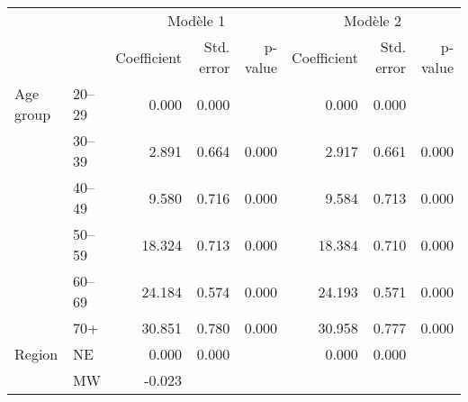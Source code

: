 \begin{table}[!h]
\centering
\begin{tabular}{llllllll}
\cline{1-8}
\multicolumn{1}{c}{} &
  \multicolumn{1}{c}{} &
  \multicolumn{3}{c}{Modèle 1} &
  \multicolumn{3}{c}{Modèle 2} \\
\multicolumn{1}{c}{} &
  \multicolumn{1}{c}{} &
  \multicolumn{1}{r}{Coefficient} &
  \multicolumn{1}{r}{Std. error} &
  \multicolumn{1}{r}{p-value} &
  \multicolumn{1}{r}{Coefficient} &
  \multicolumn{1}{r}{Std. error} &
  \multicolumn{1}{r}{p-value} \\
\cline{1-8}
\multicolumn{1}{l}{Age group} &
  \multicolumn{1}{l}{20–29} &
  \multicolumn{1}{r}{0.000} &
  \multicolumn{1}{r}{0.000} &
  \multicolumn{1}{r}{} &
  \multicolumn{1}{r}{0.000} &
  \multicolumn{1}{r}{0.000} &
  \multicolumn{1}{r}{} \\
\multicolumn{1}{l}{} &
  \multicolumn{1}{l}{30–39} &
  \multicolumn{1}{r}{2.891} &
  \multicolumn{1}{r}{0.664} &
  \multicolumn{1}{r}{0.000} &
  \multicolumn{1}{r}{2.917} &
  \multicolumn{1}{r}{0.661} &
  \multicolumn{1}{r}{0.000} \\
\multicolumn{1}{l}{} &
  \multicolumn{1}{l}{40–49} &
  \multicolumn{1}{r}{9.580} &
  \multicolumn{1}{r}{0.716} &
  \multicolumn{1}{r}{0.000} &
  \multicolumn{1}{r}{9.584} &
  \multicolumn{1}{r}{0.713} &
  \multicolumn{1}{r}{0.000} \\
\multicolumn{1}{l}{} &
  \multicolumn{1}{l}{50–59} &
  \multicolumn{1}{r}{18.324} &
  \multicolumn{1}{r}{0.713} &
  \multicolumn{1}{r}{0.000} &
  \multicolumn{1}{r}{18.384} &
  \multicolumn{1}{r}{0.710} &
  \multicolumn{1}{r}{0.000} \\
\multicolumn{1}{l}{} &
  \multicolumn{1}{l}{60–69} &
  \multicolumn{1}{r}{24.184} &
  \multicolumn{1}{r}{0.574} &
  \multicolumn{1}{r}{0.000} &
  \multicolumn{1}{r}{24.193} &
  \multicolumn{1}{r}{0.571} &
  \multicolumn{1}{r}{0.000} \\
\multicolumn{1}{l}{} &
  \multicolumn{1}{l}{70+} &
  \multicolumn{1}{r}{30.851} &
  \multicolumn{1}{r}{0.780} &
  \multicolumn{1}{r}{0.000} &
  \multicolumn{1}{r}{30.958} &
  \multicolumn{1}{r}{0.777} &
  \multicolumn{1}{r}{0.000} \\
\multicolumn{1}{l}{Region} &
  \multicolumn{1}{l}{NE} &
  \multicolumn{1}{r}{0.000} &
  \multicolumn{1}{r}{0.000} &
  \multicolumn{1}{r}{} &
  \multicolumn{1}{r}{0.000} &
  \multicolumn{1}{r}{0.000} &
  \multicolumn{1}{r}{} \\
\multicolumn{1}{l}{} &
  \multicolumn{1}{l}{MW} &
  \multicolumn{1}{r}{-0.023} &

\end{tabular}
\end{table}
